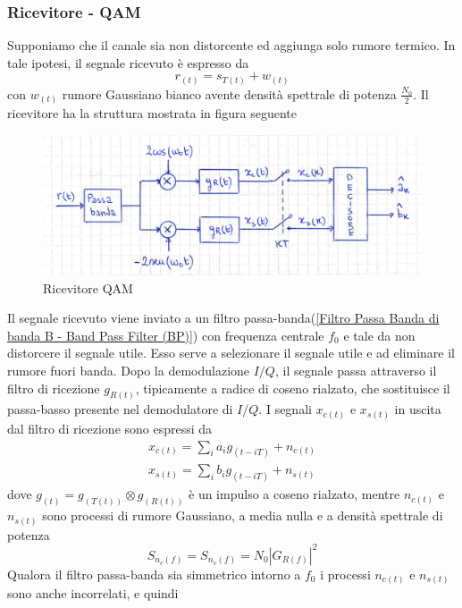         \subsubsection{Ricevitore - QAM}
            Supponiamo che il canale sia non distorcente ed aggiunga solo rumore termico. In tale ipotesi, il segnale ricevuto 
            è espresso da
            \[
                r_{(t)} = s_{T(t)}+w_{(t)}    
            \]
            con $w_{(t)}$ rumore Gaussiano bianco avente densità spettrale di potenza $\frac{N_0}{2}$. Il ricevitore ha la
            struttura mostrata in figura seguente 
            \begin{figure}[H]
                \centering
                \includegraphics[width = 12cm]{media/ricevitore qam.png}
                \caption{Ricevitore QAM}
            \end{figure}            
            Il segnale ricevuto viene inviato a un filtro passa-banda(\ref{Filtro Passa Banda di banda B - Band Pass Filter (BP)})
            con frequenza centrale $f_0$ e tale da non distorcere il segnale utile. Esso serve a selezionare il segnale utile e ad 
            eliminare il rumore fuori banda. Dopo la demodulazione $I/Q$, il segnale passa attraverso il filtro di ricezione $g_{R(t)}$,
            tipicamente a radice di coseno rialzato, che sostituisce il passa-basso presente nel demodulatore di $I/Q$. I segnali 
            $x_{c(t)}$ e $x_{s(t)}$ in uscita dal filtro di ricezione sono espressi da 
            \begin{gather}
                x_{c(t)} = \sum_{i}a_ig_{(t-iT)}+n_{c(t)}\nonumber \\
                x_{s(t)} = \sum_{i}b_ig_{(t-iT)}+n_{s(t)}\nonumber
            \end{gather}
            dove $g_{(t)} = g_{(T(t))}\otimes g_{(R(t))}$ è un impulso a coseno rialzato, mentre $n_{c(t)}$ e $n_{s(t)}$ sono 
            processi di rumore Gaussiano, a media nulla e a densità spettrale di potenza
            \[
                S_{n_c(f)} = S_{n_s(f)} = N_0\left|G_{R(f)}\right|^2   
            \]
            Qualora il filtro passa-banda sia simmetrico intorno a $f_0$ i processi $n_{c(t)}$ e $n_{s(t)}$ sono anche incorrelati, e quindi 
